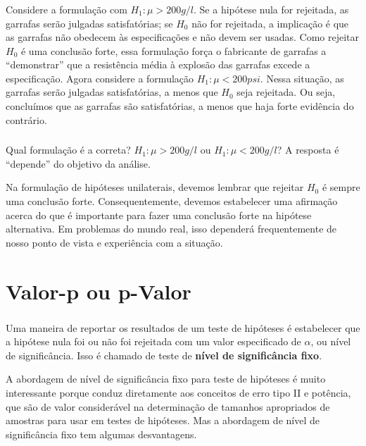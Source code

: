\documentclass[14pt,aspectratio=1610]{beamer}
\newcommand{\Ho}{\ensuremath{H_{0}}}
\begin{document}
\begin{frame}{}
\frametitle{}
\begin{block}{}
\justifying
Considere a formulação com $H_{1}:\mu> 200 g/l$. Se a hipótese nula for rejeitada, as garrafas serão julgadas satisfatórias; se $\Ho$ não for rejeitada, a implicação é 
que as garrafas não obedecem às especificações e não devem ser usadas. Como rejeitar $\Ho$ é uma conclusão forte, essa formulação força o fabricante de garrafas a 
``demonstrar'' que a resistência média à explosão das garrafas excede a especificação. Agora considere a formulação $H_{1}:\mu< 200 psi$. Nessa situação, as garrafas 
serão julgadas satisfatórias, a menos que $\Ho$ seja rejeitada. Ou seja, concluímos que as garrafas são satisfatórias, a menos que haja forte evidência do contrário.
\end{block}
\end{frame}

\begin{frame}{}
\frametitle{}
\begin{block}{}
\justifying
Qual formulação é a correta? $H_{1}:\mu> 200 g/l$ ou $H_{1}:\mu< 200 g/l$? \pause A resposta é ``depende'' do objetivo da análise.
\end{block}
\pause
\begin{block}{}
Na formulação de hipóteses unilaterais, devemos lembrar que rejeitar $\Ho$ é sempre uma conclusão forte. Consequentemente, devemos estabelecer uma afirmação 
acerca do que é importante para fazer uma conclusão forte na hipótese alternativa. Em problemas do mundo real, isso dependerá frequentemente de nosso ponto de 
vista e experiência com a situação.
\end{block}
\end{frame}

\section{Valor-p ou p-Valor}
\begin{frame}{}
\frametitle{}
\begin{block}{}
\justifying
Uma maneira de reportar os resultados de um teste de hipóteses é estabelecer que a hipótese nula foi ou não foi rejeitada com um valor especificado de $\alpha$, ou 
nível de significância. Isso é chamado de teste de\textbf{ nível de significância fixo}.
\end{block}
\pause
\begin{block}{}
\justifying
A abordagem de nível de significância fixo para teste de hipóteses é muito interessante porque conduz diretamente aos conceitos de erro tipo II e potência, que são 
de valor considerável na determinação de tamanhos apropriados de amostras para usar em testes de hipóteses. Mas a abordagem de nível de significância fixo tem 
algumas desvantagens.
\end{block}
\end{frame}
\end{document}
